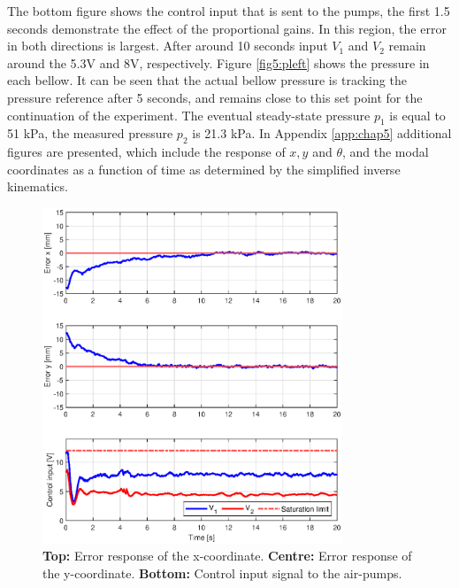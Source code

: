 The bottom figure shows the control input that is sent to the pumps, the first 1.5 seconds demonstrate the effect of the proportional gains. In this region, the error in both directions is largest. After around 10 seconds input $V_1$ and $V_2$ remain around the 5.3V and 8V, respectively. Figure \ref{fig5:pleft} shows the pressure in each bellow. It can be seen that the actual bellow pressure is tracking the pressure reference after 5 seconds, and remains close to this set point for the continuation of the experiment. The eventual steady-state pressure $p_1$ is equal to 51 kPa, the measured pressure $p_2$ is 21.3 kPa. In Appendix \ref{app:chap5} additional figures are presented, which include the response of $x,y$ and $\theta$, and the modal coordinates as a function of time as determined by the simplified inverse kinematics. 


\newpage
\begin{figure}[H]
    \centering
    \includegraphics[width = 0.8\textwidth]{Figures/Chapter5/errorsignalleftwide.eps}
    \caption{\textbf{Top:} Error response of the x-coordinate. \textbf{Centre:} Error response of the y-coordinate. \textbf{Bottom:} Control input signal to the air-pumps.}
    \label{fig5:stepleft}
\end{figure}

